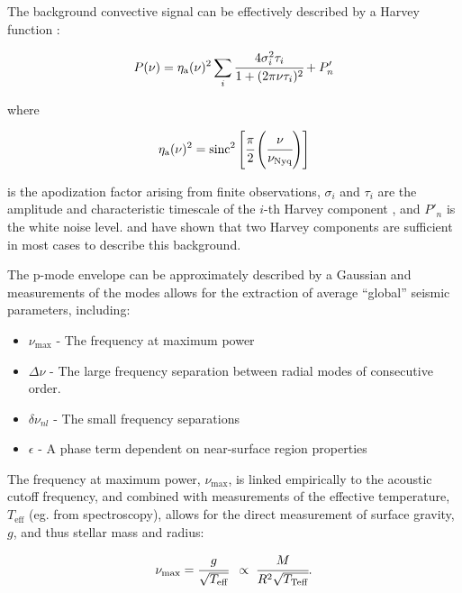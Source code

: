 The background convective signal can be effectively described by a Harvey function \citep{harvey_high-resolution_1985}:

\begin{equation}
    P(\nu) = \eta_\mathrm{a}(\nu)^2 \sum_{i} \cfrac{4\sigma_i^2\tau_i}{1+(2\pi\nu\tau_i)^2} + P'_n
    \label{eqtn:Harvey}
\end{equation}

where 

\begin{equation}
    \eta_\mathrm{a}(\nu)^2 = \operatorname{sinc}^2{\left[\cfrac{\pi}{2}\left(\cfrac{\nu}{\nu_{\mathrm{Nyq}}}\right)\right]}
    \label{eqtn:apod}
\end{equation}

\noindent is the apodization factor arising from finite observations, $\sigma_i$ and $\tau_i$ are the amplitude and characteristic timescale of the $i$-th Harvey component \citep{mathur_granulation_2011}, and $P'_n$ is the white noise level. \cite{karoff_observations_2013} and \cite{kallinger_connection_2014} have shown that two Harvey components are sufficient in most cases to describe this background.

The p-mode envelope can be approximately described by a Gaussian \citep{kallinger_evolutionary_2012} and measurements of the modes allows for the extraction of average ``global'' seismic parameters, including:

\begin{itemize}
    \item $\nu_{\mathrm{max}}$ - The frequency at maximum power \citep{kjeldsen_amplitudes_1995, brown_detection_1991}
    \item $\Delta\nu$ - The large frequency separation between radial modes of consecutive order.
    \item $\delta\nu_{nl}$ - The small frequency separations
    \item $\epsilon$ - A phase term dependent on near-surface region properties
\end{itemize}

The frequency at maximum power, $\nu_{\mathrm{max}}$, is linked empirically to the acoustic cutoff frequency, and combined with measurements of the effective temperature, $T_{\mathrm{eff}}$ (eg. from spectroscopy), allows for the direct measurement of surface gravity, $g$, and thus stellar mass and radius:

\begin{equation}
    \nu_{\mathrm{max}} = \cfrac{g}{\sqrt{T_{\mathrm{eff}}}} \;\; \propto \; \cfrac{M}{R^2 \sqrt{T_{\mathrm{Teff}}}}.
\end{equation}

